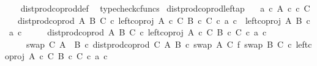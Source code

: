 \begin{isabellebody}
%
\isadelimproof
\ \ %
\endisadelimproof
%
\isatagproof
{}\isamarkupfalse%
\ dist{\isacharunderscore}{\kern0pt}prod{\isacharunderscore}{\kern0pt}coprod{}{\isacharunderscore}{\kern0pt}def\ \isamarkupfalse%
\ typecheck{\isacharunderscore}{\kern0pt}cfuncs%
\endisatagproof
{\isafoldproof}%
%
\isadelimproof
\isanewline
%
\endisadelimproof
\isanewline
{}\isamarkupfalse%
\ dist{\isacharunderscore}{\kern0pt}prod{\isacharunderscore}{\kern0pt}coprod{}{\isacharunderscore}{\kern0pt}left{\isacharunderscore}{\kern0pt}ap{\isacharcolon}{\kern0pt}\isanewline
\ \ \ {\isachardoublequoteopen}a\ {\isasymin}\isactrlsub c\ A{\isachardoublequoteclose}\ {\isachardoublequoteopen}c\ {\isasymin}\isactrlsub c\ C{\isachardoublequoteclose}\isanewline
\ \ \ {\isachardoublequoteopen}dist{\isacharunderscore}{\kern0pt}prod{\isacharunderscore}{\kern0pt}coprod{}\ A\ B\ C\ {\isasymcirc}\isactrlsub c\ {\isacharparenleft}{\kern0pt}left{\isacharunderscore}{\kern0pt}coproj\ {\isacharparenleft}{\kern0pt}A\ {\isasymtimes}\isactrlsub c\ C{\isacharparenright}{\kern0pt}\ {\isacharparenleft}{\kern0pt}B\ {\isasymtimes}\isactrlsub c\ C{\isacharparenright}{\kern0pt}\ {\isasymcirc}\isactrlsub c\ {\isasymlangle}a{\isacharcomma}{\kern0pt}\ c{\isasymrangle}{\isacharparenright}{\kern0pt}\ {\isacharequal}{\kern0pt}\ {\isasymlangle}left{\isacharunderscore}{\kern0pt}coproj\ A\ B\ {\isasymcirc}\isactrlsub c\ a{\isacharcomma}{\kern0pt}\ c{\isasymrangle}{\isachardoublequoteclose}\isanewline
%
\isadelimproof
%
\endisadelimproof
%
\isatagproof
{}\isamarkupfalse%
\ {\isacharminus}{\kern0pt}\isanewline
\ \ \isamarkupfalse%
\ {\isachardoublequoteopen}dist{\isacharunderscore}{\kern0pt}prod{\isacharunderscore}{\kern0pt}coprod{}\ A\ B\ C\ {\isasymcirc}\isactrlsub c\ {\isacharparenleft}{\kern0pt}left{\isacharunderscore}{\kern0pt}coproj\ {\isacharparenleft}{\kern0pt}A\ {\isasymtimes}\isactrlsub c\ C{\isacharparenright}{\kern0pt}\ {\isacharparenleft}{\kern0pt}B\ {\isasymtimes}\isactrlsub c\ C{\isacharparenright}{\kern0pt}\ {\isasymcirc}\isactrlsub c\ {\isasymlangle}a{\isacharcomma}{\kern0pt}\ c{\isasymrangle}{\isacharparenright}{\kern0pt}\isanewline
\ \ \ \ {\isacharequal}{\kern0pt}\ {\isacharparenleft}{\kern0pt}swap\ C\ {\isacharparenleft}{\kern0pt}A\ {\isasymCoprod}\ B{\isacharparenright}{\kern0pt}\ {\isasymcirc}\isactrlsub c\ dist{\isacharunderscore}{\kern0pt}prod{\isacharunderscore}{\kern0pt}coprod\ C\ A\ B\ {\isasymcirc}\isactrlsub c\ {\isacharparenleft}{\kern0pt}swap\ A\ C\ {\isasymbowtie}\isactrlsub f\ swap\ B\ C{\isacharparenright}{\kern0pt}{\isacharparenright}{\kern0pt}\ {\isasymcirc}\isactrlsub c\ {\isacharparenleft}{\kern0pt}left{\isacharunderscore}{\kern0pt}coproj\ {\isacharparenleft}{\kern0pt}A\ {\isasymtimes}\isactrlsub c\ C{\isacharparenright}{\kern0pt}\ {\isacharparenleft}{\kern0pt}B\ {\isasymtimes}\isactrlsub c\ C{\isacharparenright}{\kern0pt}\ {\isasymcirc}\isactrlsub c\ {\isasymlangle}a{\isacharcomma}{\kern0pt}\ c{\isasymrangle}{\isacharparenright}{\kern0pt}{\isachardoublequoteclose}\isanewline

\end{isabellebody}
